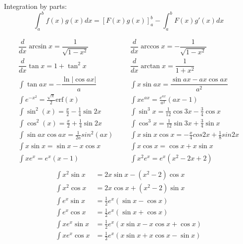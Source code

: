 Integration by parts:
\[\int_a^bf(x)g(x)dx = [F(x)g(x)]_a^b-\int_a^bF(x)g'(x)dx\]

\begin{align*}
	\dfrac{d}{dx}\arcsin x = \dfrac{1}{\sqrt{1-x^2}} &&& \dfrac{d}{dx}\arccos x = -\dfrac{1}{\sqrt{1-x^2}} \\
	\dfrac{d}{dx}\tan x = 1+\tan^2 x &&& \dfrac{d}{dx}\arctan x = \dfrac{1}{1+x^2} \\
	\int\tan ax = -\dfrac{\ln|\cos ax|}{a} &&& \int x\sin ax = \dfrac{\sin ax-ax \cos ax}{a^2} \\
	\int e^{-x^2} = \frac{\sqrt \pi}{2} \text{erf}(x) &&& \int xe^{ax} = \frac{e^{ax}}{a^2}(ax-1) \\
    \int \sin^2(x) = \frac{x}{2} - \frac{1}{4} \sin 2x &&& \int \sin^3 x = \frac{1}{12}\cos 3x - \frac{3}{4} \cos x \\
    \int \cos^2(x) = \frac{x}{2} + \frac{1}{4} \sin 2x &&& \int \cos^3 x = \frac{1}{12}\sin 3x + \frac{3}{4} \sin x \\
    \int \sin ax \cos ax = \frac{1}{2a}sin^2(ax) &&& \int x \sin x \cos x = -\frac{x}{4}cos 2x + \frac{1}{8} sin 2x \\
    \int x \sin x = \sin x - x \cos x &&& \int x \cos x = \cos x + x \sin x \\
    \int xe^x = e^x(x - 1) &&& \int x^2 e^x = e^x(x^2 - 2x + 2) \\
\end{align*}
\vspace{-1cm}
\begin{align*}
    \int x^2 \sin x &= 2x \sin x - (x^2 - 2) \cos x \\
    \int x^2 \cos x &= 2x \cos x + (x^2 - 2) \sin x \\
    \int e^x \sin x &= \frac{1}{2}e^x (\sin x - \cos x) \\
    \int e^x \cos x &= \frac{1}{2}e^x (\sin x + \cos x) \\
    \int xe^x \sin x &= \frac{1}{2}e^x (x \sin x - x \cos x + \cos x) \\
    \int xe^x \cos x &= \frac{1}{2}e^x (x \sin x + x \cos x - \sin x)
\end{align*}
